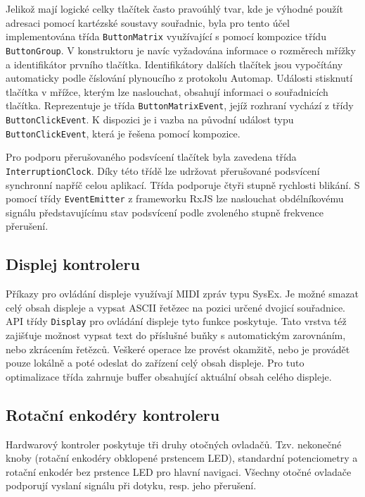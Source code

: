 \documentclass[thesis=M,czech]{FITthesis}[2019/03/06]
\begin{document}
	Jelikož mají logické celky tlačítek často pravoúhlý tvar, kde je výhodné použít adresaci pomocí
	kartézské soustavy souřadnic, byla pro tento účel implementována třída \texttt{ButtonMatrix} využívající
	s pomocí kompozice třídu \texttt{ButtonGroup}. V konstruktoru je navíc vyžadována informace o rozměrech mřížky a identifikátor prvního tlačítka. 
	Identifikátory dalších tlačítek jsou vypočítány automaticky podle číslování plynoucího z protokolu Automap.
	Události stisknutí tlačítka v mřížce, kterým lze naslouchat, obsahují informaci o souřadnicích tlačítka. Reprezentuje je třída \texttt{ButtonMatrixEvent},
	jejíž rozhraní vychází z třídy \texttt{ButtonClickEvent}. K dispozici je i vazba na původní událost typu \texttt{ButtonClickEvent}, která je řešena pomocí kompozice.
	
	Pro podporu přerušovaného podsvícení tlačítek byla zavedena třída \\\texttt{InterruptionClock}. Díky této třídě lze 
	udržovat přerušované podsvícení synchronní napříč celou aplikací. Třída podporuje čtyři stupně rychlosti blikání.
	S pomocí třídy \texttt{EventEmitter} z frameworku RxJS lze naslouchat obdélníkovému signálu představujícímu stav podsvícení podle zvoleného stupně frekvence přerušení.
	
	\subsection{Displej kontroleru}
	Příkazy pro ovládání displeje využívají MIDI zpráv typu SysEx. Je možné smazat celý obsah displeje a 
	vypsat ASCII řetězec na pozici určené dvojicí souřadnice. API třídy \texttt{Display} pro ovládání displeje tyto funkce poskytuje.
	Tato vrstva též zajišťuje možnost vypsat text do příslušné buňky s automatickým zarovnáním, nebo zkrácením řetězců.
	Veškeré operace lze provést okamžitě, nebo je provádět pouze lokálně a poté odeslat do zařízení celý obsah displeje.
	Pro tuto optimalizace třída zahrnuje buffer obsahující aktuální obsah celého displeje.
	
	\subsection{Rotační enkodéry kontroleru}
	Hardwarový kontroler poskytuje tři druhy otočných ovladačů. Tzv. nekonečné knoby (rotační enkodéry obklopené
	prstencem LED), standardní potenciometry a rotační enkodér bez prstence LED pro hlavní navigaci.
	Všechny otočné ovladače podporují vyslaní signálu při dotyku, resp. jeho přerušení. 
	
\end{document}
